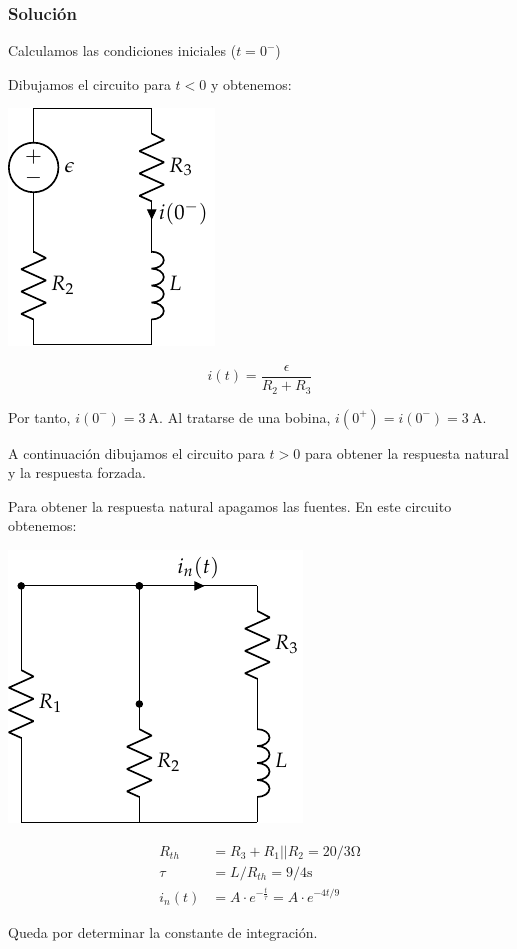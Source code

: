 \documentclass[12pt]{article}
\begin{document}
\subsubsection*{Solución}

Calculamos las condiciones iniciales ($t = 0^-$)

Dibujamos el circuito para $t < 0$ y obtenemos:

\begin{minipage}{0.3\textwidth}
\includegraphics{figs/FM_4_2_t0-}
\end{minipage}
\begin{minipage}{0.7\textwidth}
  \begin{equation*}
    i(t) = \frac{\epsilon}{R_2 + R_3}
  \end{equation*}
\end{minipage}

Por tanto, $i(0^-) = \SI{3}{\ampere}$. Al tratarse de una bobina, $i(0^+) = i(0^-) = \SI{3}{\ampere}$.

A continuación dibujamos el circuito para $t > 0$ para obtener la respuesta natural y la respuesta forzada.

Para obtener la respuesta natural apagamos las fuentes. En este circuito obtenemos:

\begin{minipage}{0.3\textwidth}
\includegraphics{figs/FM_4_2_natural}
\end{minipage}
\begin{minipage}{0.7\textwidth}
  \begin{align*}
    R_{th} &= R_3 + R_1||R_2 = 20/3\si{\ohm}\\
    \tau &= L/R_{th} = 9/4\si{\second}\\
    i_n(t) &= A \cdot e^{-\frac{t}{\tau}} = A \cdot e^{-4t/9}
  \end{align*}
\end{minipage}
Queda por determinar la constante de integración.
\end{document}
